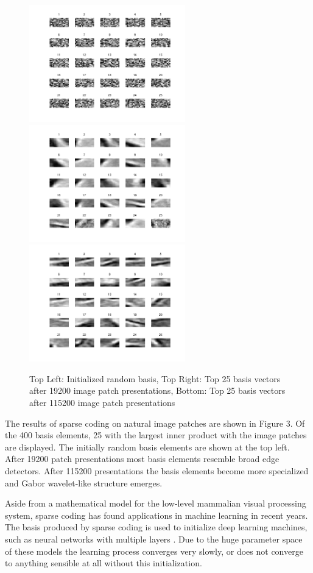 \documentclass[12pt,a4paper]{article}
\begin{document}
\begin{figure}[ht]
\centering
\includegraphics[height=2in]{random.png}  
\includegraphics[height=2in]{iter1.png} 
\includegraphics[height=2in]{iter6.png}
\caption{ \small{Top Left: Initialized random basis, Top Right: Top 25 basis vectors after 19200 image patch presentations, Bottom: Top 25 basis vectors after 115200 image patch presentations}} 
\end{figure}
\newpage
\noindent
The results of sparse coding on natural image patches are shown in Figure 3. Of the 400 basis elements, 25 with the largest inner product with the image patches are displayed. The initially random basis elements are shown at the top left. After 19200 patch presentations most basis elements resemble broad edge detectors. After 115200 presentations the basis elements become more specialized and Gabor wavelet-like structure emerges.

Aside from a mathematical model for the low-level mammalian visual processing system, sparse coding has found applications in machine learning in recent years. The basis produced by sparse coding is used to initialize deep learning machines, such as neural networks with multiple layers \cite{DeepLearning}. Due to the huge parameter space of these models the learning process converges very slowly, or does not converge to anything sensible at all without this initialization.
\end{document}
